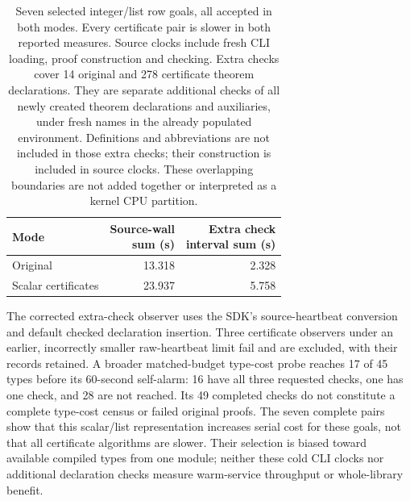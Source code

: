 \documentclass[10pt,twocolumn]{article}
\begin{document}
\begin{table}[t]
\centering
\small
\setlength{\tabcolsep}{4pt}
\begin{tabular}{lrr}
\toprule
Mode & \shortstack{Source-wall\\sum (s)} &
\shortstack{Extra check\\interval sum (s)} \\
\midrule
Original & 13.318 & 2.328 \\
Scalar certificates & 23.937 & 5.758 \\
\bottomrule
\end{tabular}
\caption{Seven selected integer/list row goals, all accepted in both modes.
Every certificate pair is slower in both reported measures.
Source clocks include fresh CLI loading, proof construction and checking.
Extra checks cover 14 original and 278 certificate theorem declarations.
They are separate additional checks of all newly created theorem
declarations and auxiliaries, under fresh names in the already populated
environment. Definitions and abbreviations are not included in those extra
checks; their construction is included in source clocks. These overlapping
boundaries are not added together or interpreted as a kernel CPU partition.}
\label{tab:modern-native-certificates}
\end{table}

The corrected extra-check observer uses the SDK's source-heartbeat conversion
and default checked declaration insertion. Three certificate observers under
an earlier, incorrectly smaller raw-heartbeat limit fail and are excluded,
with their records retained. A broader matched-budget type-cost probe reaches
17 of 45 types before its 60-second self-alarm: 16 have all three requested
checks, one has one check, and 28 are not reached. Its 49 completed checks
do not constitute a complete type-cost census or failed original proofs.
The seven complete pairs show that this scalar/list representation increases
serial cost for these goals, not that all certificate algorithms are slower.
Their selection is biased toward available compiled types from one module;
neither these cold CLI clocks nor additional declaration checks measure
warm-service throughput or whole-library benefit.
\end{document}
